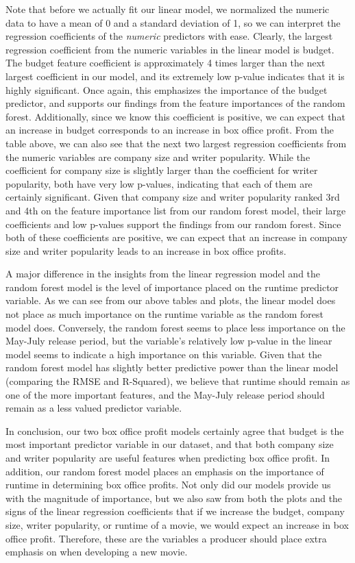 \documentclass[10pt]{article}
\begin{document}
Note that before we actually fit our linear model, we normalized the numeric data to have a mean of 0 and a standard deviation of 1, so we can interpret the regression coefficients of the \textit{numeric} predictors with ease. Clearly, the largest regression coefficient from the numeric variables in the linear model is budget. The budget feature coefficient is approximately 4 times larger than the next largest coefficient in our model, and its extremely low p-value indicates that it is highly significant. Once again, this emphasizes the importance of the budget predictor, and supports our findings from the feature importances of the random forest. Additionally, since we know this coefficient is positive, we can expect that an increase in budget corresponds to an increase in box office profit. From the table above, we can also see that the next two largest regression coefficients from the numeric variables are company size and writer popularity. While the coefficient for company size is slightly larger than the coefficient for writer popularity, both have very low p-values, indicating that each of them are certainly significant. Given that company size and writer popularity ranked 3rd and 4th on the feature importance list from our random forest model, their large coefficients and low p-values support the findings from our random forest. Since both of these coefficients are positive, we can expect that an increase in company size and writer popularity leads to an increase in box office profits.

A major difference in the insights from the linear regression model and the random forest model is the level of importance placed on the runtime predictor variable. As we can see from our above tables and plots, the linear model does not place as much importance on the runtime variable as the random forest model does. Conversely, the random forest seems to place less importance on the May-July release period, but the variable’s relatively low p-value in the linear model seems to indicate a high importance on this variable. Given that the random forest model has slightly better predictive power than the linear model (comparing the RMSE and R-Squared), we believe that runtime should remain as one of the more important features, and the May-July release period should remain as a less valued predictor variable.

In conclusion, our two box office profit models certainly agree that budget is the most important predictor variable in our dataset, and that both company size and writer popularity are useful features when predicting box office profit. In addition, our random forest model places an emphasis on the importance of runtime in determining box office profits. Not only did our models provide us with the magnitude of importance, but we also saw from both the plots and the signs of the linear regression coefficients that if we increase the budget, company size, writer popularity, or runtime of a movie, we would expect an increase in box office profit. Therefore, these are the variables a producer should place extra emphasis on when developing a new movie.
\end{document}
